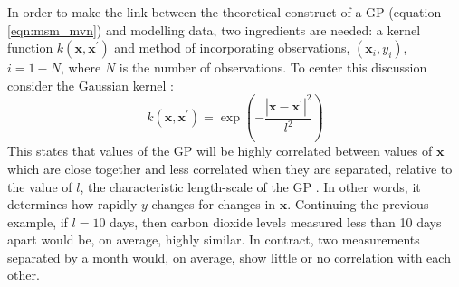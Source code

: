 In order to make the link between the theoretical construct of a GP (equation \ref{eqn:msm_mvn}) and modelling data, two ingredients are needed: a kernel function $k(\mathbf{x}, \mathbf{x}^{\prime})$ and method of incorporating observations, $(\mathbf{x}_{i}, y_{i})$, $i = 1 - N$, where $N$ is the number of observations.  To center this discussion consider the Gaussian kernel \cite{rasmussenGaussianProcessesMachine2006}: 
\begin{equation}\label{eqn:eg_rbf}
    k(\mathbf{x}, \mathbf{x}^{\prime}) = \exp{\left(-\frac{\left|\mathbf{x}-\mathbf{x}^{\prime}\right|^{2}}{l^{2}}\right)}
\end{equation}\label{eqn:msm_rbf}
This states that values of the GP will be highly correlated between values of $\mathbf{x}$ which are close together and less correlated when they are separated,  relative to the value of $l$, the characteristic length-scale of the GP \cite{rasmussenGaussianProcessesMachine2006}. In other words, it determines how rapidly  $y$ changes for changes in $\mathbf{x}$. Continuing the previous example, if $l=10$ days, then carbon dioxide levels measured  less than 10 days apart would be, on average, highly similar. In contract, two measurements separated by a month would, on average, show little or no correlation with each other. 

